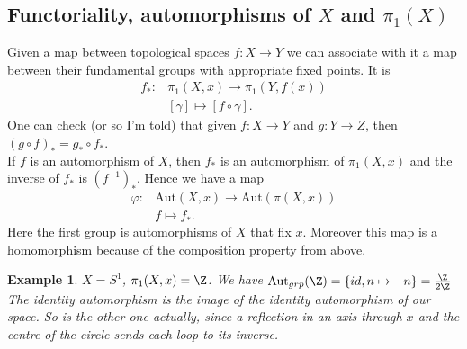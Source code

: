 \documentclass[a4paper]{article}
\newtheorem{exmp}[thm]{Example}
\begin{document}
\subsection*{Functoriality, automorphisms of $X$ and $\pi_1(X)$}
Given a map between topological spaces $f:X\to Y$ we can associate with it a map between their fundamental groups with appropriate fixed points. It is
\begin{align*}
    f_*: & \pi_1(X,x)\to  \pi_1(Y,f(x))\\
    & \left[ \gamma \right]\mapsto \left[ f\circ\gamma \right]  
.\end{align*}
One can check (or so I'm told) that given $f:X\to Y$ and $g:Y\to Z$, then $(g\circ f)_*=g_*\circ f_*$.\\
If  $f$ is an automorphism of $X$, then $f_*$ is an automorphism of $\pi_1(X,x)$ and the inverse of $f_*$ is $\left( f^{-1} \right)_*$. Hence we have a map
\begin{align*}
    \varphi: & \text{Aut}(X,x)\to \text{Aut}(\pi (X,x))\\
    & f\mapsto f_*
.\end{align*}
Here the first group is automorphisms of $X$ that fix $x$. Moreover this map is a homomorphism because of the composition property from above.
\begin{exmp}
    $X=S^{1}$, $\pi_1(X,x)=\Z$. We have $\text{Aut}_{grp}(\Z)=\{id,n\mapsto -n\}=\frac{\Z}{2\Z}$ The identity automorphism is the image of the identity automorphism of our space. So is the other one actually, since a reflection in an axis through $x$ and the centre of the circle sends each loop to its inverse.

\end{exmp}
\end{document}
